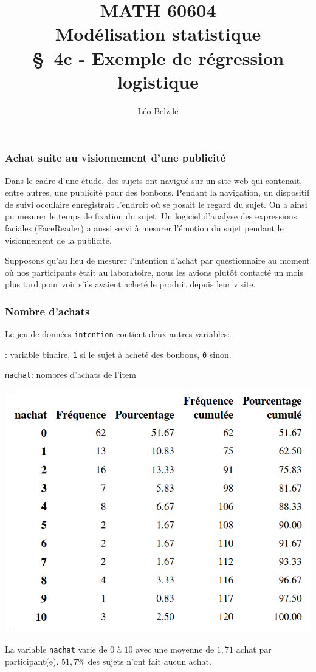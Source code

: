 \documentclass{beamer}
\title[\color{white}{MATH 60604 \S~4c - Exemple de régression logistique}]{\texorpdfstring{MATH 60604 \\Modélisation statistique \\ \S~4c - Exemple de régression logistique}{MATH 60604 \\Modélisation statistique \\ \S~4c - Exemple de régression logistique}}
\author{Léo Belzile}
\institute{HEC Montréal\\
Département de sciences de la décision}
\date{}
\begin{document}
\frame{\titlepage}

\begin{frame}[fragile]
\frametitle{Achat suite au visionnement d'une publicité}

Dans le cadre d'une étude, des sujets ont navigué sur un site web
qui contenait, entre autres, une publicité pour des bonbons. Pendant la
navigation, un dispositif de suivi occulaire enregistrait l'endroit où se posait le regard du
sujet. On a ainsi pu mesurer le temps de fixation du sujet. Un logiciel d'analyse des expressions faciales (FaceReader) a aussi servi à mesurer l'émotion du sujet pendant le visionnement de la publicité.
 
\vp


Supposons qu'au lieu de mesurer l'intention d'achat par questionnaire au moment où nos participants était au laboratoire, \alert{nous les avions plutôt contacté un mois plus tard pour voir s'ils avaient acheté le produit depuis leur visite}.
\end{frame}
\begin{frame}
\frametitle{Nombre d'achats}
Le jeu de données \texttt{intention} contient deux autres variables:

\bi\item {}: variable binaire, \texttt{1} si le sujet à acheté des bonbons, \texttt{0} sinon.
\item \texttt{nachat}: nombres d'achats de l'item
\ei
\begin{center}
\includegraphics[width = 0.6\linewidth]{img/c4/diapos8-e2}
\end{center}
{\small 
La variable \texttt{nachat} varie de $0$ à $10$ avec une moyenne de $1,71$ achat par participant(e). $51,7$\% des sujets n'ont fait aucun achat.
}
\end{frame}
% 
\end{document}
